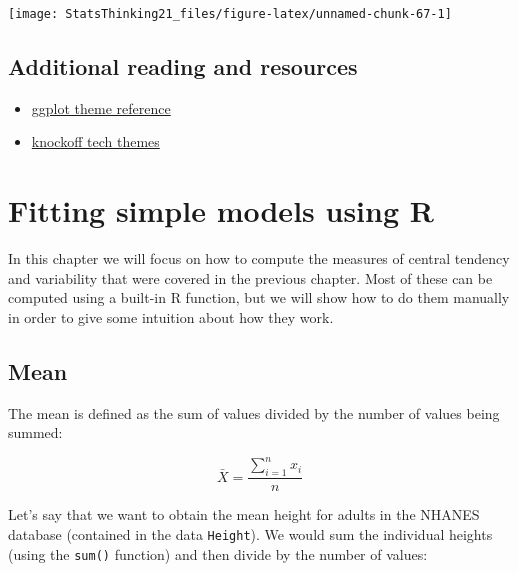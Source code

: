 \documentclass[12pt,]{book}
\newenvironment{Shaded}{\begin{snugshade}}{\end{snugshade}}
\newcommand{\KeywordTok}[1]{\textcolor[rgb]{0.13,0.29,0.53}{\textbf{#1}}}
\newcommand{\NormalTok}[1]{#1}
\newcommand{\OperatorTok}[1]{\textcolor[rgb]{0.81,0.36,0.00}{\textbf{#1}}}
\newcommand{\StringTok}[1]{\textcolor[rgb]{0.31,0.60,0.02}{#1}}
\begin{document}
\texttt{[image: StatsThinking21\_files/figure-latex/unnamed-chunk-67-1]}

\hypertarget{additional-reading-and-resources}{%
\section{Additional reading and resources}\label{additional-reading-and-resources}}

\begin{itemize}
\item
  \href{http://ggplot2.tidyverse.org/reference/ggtheme.html}{ggplot theme reference}
\item
  \href{http://www.ggplot2-exts.org/ggtech.html}{knockoff tech themes}
\end{itemize}

\hypertarget{fitting-simple-models-using-r}{%
\chapter{Fitting simple models using R}\label{fitting-simple-models-using-r}}

In this chapter we will focus on how to compute the measures of central tendency and variability that were covered in the previous chapter. Most of these can be computed using a built-in R function, but we will show how to do them manually in order to give some intuition about how they work.

\hypertarget{mean}{%
\section{Mean}\label{mean}}

The mean is defined as the sum of values divided by the number of values being summed:

\[
\bar{X} = \frac{\sum_{i=1}^{n}x_i}{n}
\]

Let's say that we want to obtain the mean height for adults in the NHANES database (contained in the data \texttt{Height}). We would sum the individual heights (using the \texttt{sum()} function) and then divide by the number of values:

\begin{Shaded}
\end{Shaded}
\end{document}
